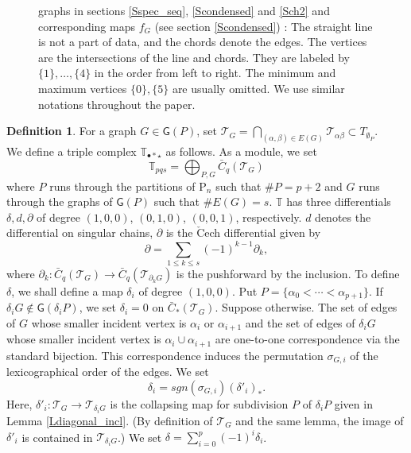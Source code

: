 \documentclass[reqno]{amsart}
\theoremstyle{definition}
\newtheorem{defi}{Definition}[section]
\theoremstyle{plain}
\newcommand{\CECHC}{\check{\mathrm{C}}}
\newcommand{\TT}{\mathcal{T}} %
\newcommand{\TTH}{\mathbb{T}}%
\newcommand{\GG}{\mathsf{G}}%
\newcommand{\PP}{\mathrm{P}} %
\begin{document}
\begin{figure}
\begin{center}

\end{center}
\caption{graphs in sections \ref{Sspec_seq}, \ref{Scondensed} and \ref{Sch2}  and corresponding maps $f_G$ (see section \ref{Scondensed}) :  The straight line is not a part of data, and  the chords denote the edges. The vertices are the intersections of the line and chords. They are labeled  by $\{1\},\dots, \{4\}$ in the order from left to right. The minimum  and maximum vertices $\{0\}, \{5\}$ are usually omitted.  We use similar notations throughout the paper.} \label{Fgraphs_ch2}
\end{figure}

\begin{defi}\label{Dtriple}
 For a graph $G\in \GG(P)$, set
$\TT_G=\bigcap_{(\alpha,\beta)\in E(G)} \TT_{\alpha\beta}\subset T_{\emptyset_P}$. \\
\indent We define a triple complex $\TTH_{\bullet * \star}$ as follows. 
As a module, we set 
\[
\TTH_{p q s}=\bigoplus_{P, G}\bar C_q(\TT_G)
\]
where $P$ runs through the partitions of $\PP_{n}$ such that $\# P=p+2$ and $G$ runs through
the graphs of $\GG(P)$ such that $\#E(G)=s$. $\TTH$ has three differentials $\delta, d, \partial$ of degree $(1,0,0)$, $(0,1,0)$, $(0,0,1)$, respectively. $d$ denotes the differential on singular chains, $\partial$ is the $\CECHC$ech differential given by
\[
\partial=\sum_{1\leq k\leq s}(-1)^{k-1}\partial_k,
\]
where $\partial_k:\bar C_q(\TT_G)\to \bar C_q(\TT_{\partial_kG})$ is the pushforward by the inclusion. To define $\delta$, we shall define a map $\delta_i$ of degree $(1,0,0)$. 
Put $P=\{\alpha_0<\cdots <\alpha_{p+1}\}$.  If $\delta_iG\not\in \GG(\delta_iP)$,   we set $\delta_i=0$ on $\bar C_*(\TT_G)$. Suppose otherwise.
 The set of edges of $G$ whose smaller incident vertex  is $\alpha_i$ or $\alpha_{i+1}$ and the set of edges of $\delta_i G$ whose smaller incident vertex is $\alpha_i\cup \alpha_{i+1}$ are one-to-one correspondence via the standard bijection. This correspondence induces the permutation $\sigma_{G,i}$ of the lexicographical order of the edges. We set 
\[
\delta_i=sgn(\sigma_{G,i})(\delta'_{i})_*. 
\]Here, $\delta'_i:\TT_G \to \TT_{\delta_iG}$ is the collapsing map for subdivision $P$ of $\delta_iP$ given in Lemma \ref{Ldiagonal_incl}. (By definition of $\TT_G$ and the same lemma, the image of $\delta'_i$ is contained in $\TT_{\delta_iG}$.) We set 
$\delta=\sum_{i=0}^{p}(-1)^i\delta_i $.
\end{defi}
\end{document}
